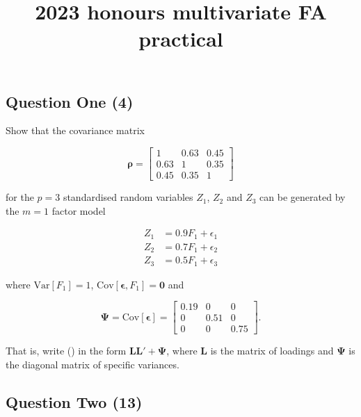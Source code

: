 \documentclass[
  letterpaper,
  DIV=11,
  numbers=noendperiod]{scrartcl}
\title{2023 honours multivariate FA practical}
\author{}
\date{}
\begin{document}
\maketitle
\ifdefined\Shaded\renewenvironment{Shaded}{\begin{tcolorbox}[interior hidden, frame hidden, boxrule=0pt, breakable, borderline west={3pt}{0pt}{shadecolor}, enhanced, sharp corners]}{\end{tcolorbox}}\fi

\hypertarget{question-one-4}{%
\subsection{Question One (4)}\label{question-one-4}}

Show that the covariance matrix

\[
\boldsymbol{\rho} = 
\begin{bmatrix}
1 & 0.63 & 0.45 \\
0.63 & 1 & 0.35 \\
0.45 & 0.35 & 1 
\end{bmatrix}
\]

for the \(p=3\) standardised random variables \(Z_1\), \(Z_2\) and
\(Z_3\) can be generated by the \(m=1\) factor model

\begin{align*}
Z_1 &= 0.9F_1 + \epsilon_1 \\
Z_2 &= 0.7F_1 + \epsilon_2 \\
Z_3 &= 0.5F_1 + \epsilon_3
\end{align*}

where \(\mathrm{Var}[F_1]=1\),
\(\mathrm{Cov}[\mathbf{\epsilon}, F_1]=\mathbf{0}\) and

\[
\mathbf{\Psi} = \mathrm{Cov}[\mathbf{\epsilon}] = 
\begin{bmatrix}
0.19 & 0 & 0 \\
0 & 0.51 & 0 \\
0 & 0 & 0.75 
\end{bmatrix}.
\]

That is, write (\boldsymbol{\rho}) in the form
\(\mathbf{L}\mathbf{L}' + \mathbf{\Psi}\), where \(\mathbf{L}\) is the
matrix of loadings and \(\mathbf{\Psi}\) is the diagonal matrix of
specific variances.

\hypertarget{question-two-13}{%
\subsection{Question Two (13)}\label{question-two-13}}
\end{document}
